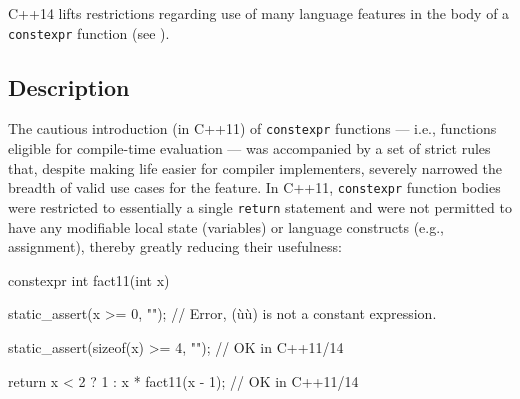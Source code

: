

\setcounter{table}{0}
\setcounter{footnote}{0}
\setcounter{lstlisting}{0}


C++14 lifts restrictions regarding use of many language features in the
body of a \lstinline!constexpr! function (see ).

\subsection[Description]{Description}\label{description}

The cautious introduction (in C++11) of \lstinline!constexpr!
functions --- i.e., functions eligible for compile-time evaluation
--- was accompanied by a set of strict rules that, despite making life
easier for compiler implementers, severely narrowed the breadth of valid
use cases for the feature. In C++11, \lstinline!constexpr!
function bodies were restricted to essentially a single
\lstinline!return! statement and were not permitted to have any modifiable
local state (variables) or  language constructs
(e.g., assignment), thereby greatly reducing their \mbox{usefulness}:

\begin{emcppslisting}
constexpr int fact11(int x)
{
    static_assert(x >= 0, "");
        // Error, (ù{}ù) is not a constant expression.

    static_assert(sizeof(x) >= 4, "");  // OK in C++11/14

    return x < 2 ? 1 : x * fact11(x - 1);  // OK in C++11/14
}
\end{emcppslisting}

